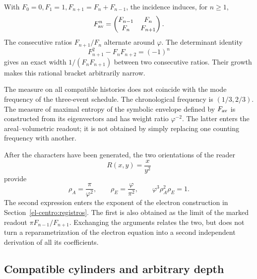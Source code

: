 With \(F_0=0,F_1=1,F_{n+1}=F_n+F_{n-1}\), the incidence induces, for \(n\geq1\),
\[
 F_{\rm av}^n=\begin{pmatrix}F_{n-1}&F_n\\F_n&F_{n+1}\end{pmatrix}.
\]
The consecutive ratios \(F_{n+1}/F_n\) alternate around \(\varphi\). The determinant identity
\[
 F_{n+1}^2-F_nF_{n+2}=(-1)^n
\]
gives an exact width \(1/(F_nF_{n+1})\) between two consecutive ratios. Their growth makes this rational bracket arbitrarily narrow.

The measure on all compatible histories does not coincide with the mode frequency of the three-event schedule. The chronological frequency is \((1/3,2/3)\). The measure of maximal entropy of the symbolic envelope defined by \(F_{\rm av}\) is constructed from its eigenvectors and has weight ratio \(\varphi^{-2}\). The latter enters the areal--volumetric readout; it is not obtained by simply replacing one counting frequency with another.




After the characters have been generated, the two orientations of the reader
\[
 R(x,y)=\frac{x}{y^2}
\]
provide
\begin{equation}
 \rho_A=\frac\pi{\varphi^2},\qquad
 \rho_E=\frac\varphi{\pi^2},\qquad
 \varphi^3\rho_A^2\rho_E=1.
 \label{eq:areal-electron}
\end{equation}
The second expression enters the exponent of the electron construction in Section~\ref{el-centro:registros}. The first is also obtained as the limit of the marked readout \(\pi F_{n-1}/F_{n+1}\). Exchanging the arguments relates the two, but does not turn a reparametrization of the electron equation into a second independent derivation of all its coefficients.




\subsection{Compatible cylinders and arbitrary depth}

